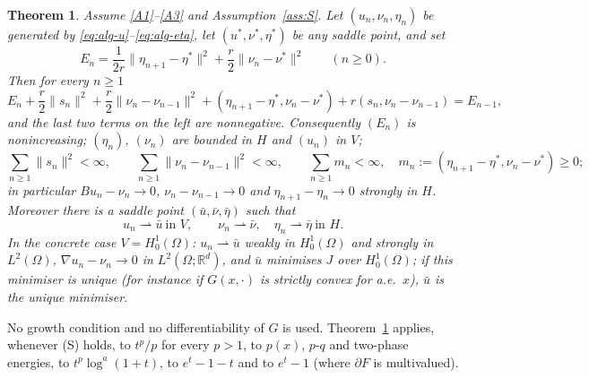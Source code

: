 \documentclass[11pt]{amsart}
\newtheorem{maintheorem}{Theorem}
\theoremstyle{definition}
\theoremstyle{remark}
\numberwithin{equation}{section}
\newcommand{\R}{\mathbb{R}}
\newcommand{\norm}[1]{\lVert #1\rVert}
\newcommand{\weak}{\rightharpoonup}
\begin{document}
\begin{maintheorem}\label{thm:A}
Assume \ref{A1}--\ref{A3} and Assumption~\ref{ass:S}. Let $(u_n,\nu_n,\eta_n)$ be generated by \eqref{eq:alg-u}--\eqref{eq:alg-eta}, let $(u^*,\nu^*,\eta^*)$ be any saddle point, and set
\[
E_n=\frac1{2r}\norm{\eta_{n+1}-\eta^*}^2+\frac r2\norm{\nu_n-\nu^*}^2\qquad(n\ge0).
\]
Then for every $n\ge1$
\begin{equation}\label{eq:lyap}
E_n+\frac r2\norm{s_n}^2+\frac r2\norm{\nu_n-\nu_{n-1}}^2+(\eta_{n+1}-\eta^*,\nu_n-\nu^*)+r(s_n,\nu_n-\nu_{n-1})=E_{n-1},
\end{equation}
and the last two terms on the left are nonnegative. Consequently $(E_n)$ is nonincreasing; $(\eta_n)$, $(\nu_n)$ are bounded in $H$ and $(u_n)$ in $V$;
\[
\sum_{n\ge1}\norm{s_n}^2<\infty,\qquad\sum_{n\ge1}\norm{\nu_n-\nu_{n-1}}^2<\infty,\qquad\sum_{n\ge1}m_n<\infty,\quad m_n:=(\eta_{n+1}-\eta^*,\nu_n-\nu^*)\ge0;
\]
in particular $Bu_n-\nu_n\to0$, $\nu_n-\nu_{n-1}\to0$ and $\eta_{n+1}-\eta_n\to0$ strongly in $H$. Moreover there is a saddle point $(\bar u,\bar\nu,\bar\eta)$ such that
\[
u_n\weak\bar u\ \text{in }V,\qquad\nu_n\weak\bar\nu,\quad\eta_n\weak\bar\eta\ \text{in }H .
\]
In the concrete case $V=H^1_0(\Omega)$: $u_n\weak\bar u$ weakly in $H^1_0(\Omega)$ and strongly in $L^2(\Omega)$, $\nabla u_n-\nu_n\to0$ in $L^2(\Omega;\R^d)$, and $\bar u$ minimises $J$ over $H^1_0(\Omega)$; if this minimiser is unique (for instance if $G(x,\cdot)$ is strictly convex for a.e.\ $x$), $\bar u$ is the unique minimiser.
\end{maintheorem}

No growth condition and no differentiability of $G$ is used. Theorem~\ref{thm:A} applies, whenever (S) holds, to $t^p/p$ for every $p>1$, to $p(x)$, $p$-$q$ and two-phase energies, to $t^p\log^a(1+t)$, to $e^t-1-t$ and to $e^t-1$ (where $\partial F$ is multivalued).
\end{document}
